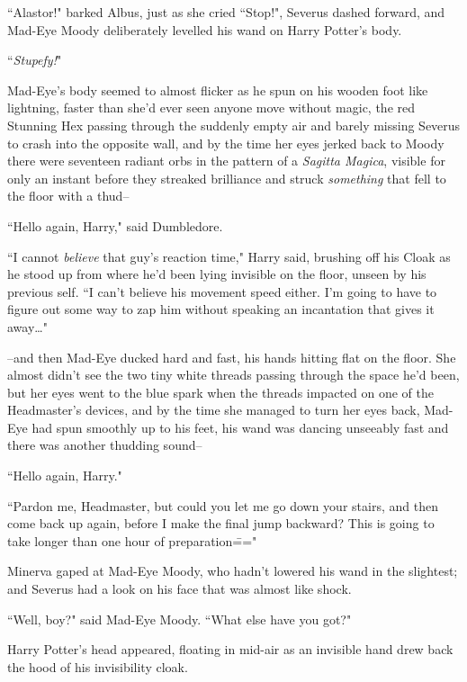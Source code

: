 ``Alastor!" barked Albus, just as she cried ``Stop!", Severus dashed forward, and Mad-Eye Moody deliberately levelled his wand on Harry Potter's body.

``\emph{Stupefy!}"

Mad-Eye's body seemed to almost flicker as he spun on his wooden foot like lightning, faster than she'd ever seen anyone move without magic, the red Stunning Hex passing through the suddenly empty air and barely missing Severus to crash into the opposite wall, and by the time her eyes jerked back to Moody there were seventeen radiant orbs in the pattern of a \emph{Sagitta Magica}, visible for only an instant before they streaked brilliance and struck \emph{something} that fell to the floor with a thud\---

\later

``Hello again, Harry," said Dumbledore.

``I cannot \emph{believe} that guy's reaction time," Harry said, brushing off his Cloak as he stood up from where he'd been lying invisible on the floor, unseen by his previous self. ``I can't believe his movement speed either. I'm going to have to figure out some way to zap him without speaking an incantation that gives it away{\ldots}"

\later

\---and then Mad-Eye ducked hard and fast, his hands hitting flat on the floor. She almost didn't see the two tiny white threads passing through the space he'd been, but her eyes went to the blue spark when the threads impacted on one of the Headmaster's devices, and by the time she managed to turn her eyes back, Mad-Eye had spun smoothly up to his feet, his wand was dancing unseeably fast and there was another thudding sound\---

\later

``Hello again, Harry."

``Pardon me, Headmaster, but could you let me go down your stairs, and then come back up again, before I make the final jump backward? This is going to take longer than one hour of preparation\==="

\later

Minerva gaped at Mad-Eye Moody, who hadn't lowered his wand in the slightest; and Severus had a look on his face that was almost like shock.

``Well, boy?" said Mad-Eye Moody. ``What else have you got?"

Harry Potter's head appeared, floating in mid-air as an invisible hand drew back the hood of his invisibility cloak.


